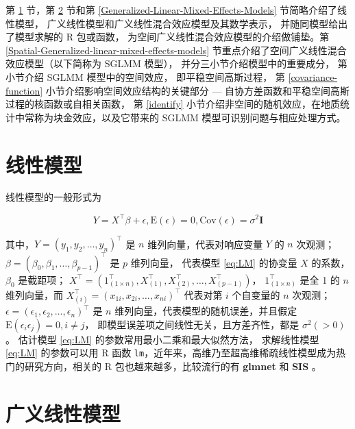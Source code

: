 \documentclass[12pt,a4paper,UTF8,twoside]{book}
\theoremstyle{definition}
\theoremstyle{definition}
\theoremstyle{definition}
\theoremstyle{remark}
\begin{document}
第 \ref{Linear-Models} 节，第 \ref{Generalized-Linear-Models} 节和第
\ref{Generalized-Linear-Mixed-Effects-Models} 节简略介绍了线性模型，
广义线性模型和广义线性混合效应模型及其数学表示，
并随同模型给出了模型求解的 R 包或函数，
为空间广义线性混合效应模型的介绍做铺垫。第
\ref{Spatial-Generalized-linear-mixed-effects-models}
节重点介绍了空间广义线性混合效应模型（以下简称为 SGLMM 模型），
并分三小节介绍模型中的重要成分， 第 小节介绍 SGLMM 模型中的空间效应，
即平稳空间高斯过程， 第 \ref{covariance-function}
小节介绍影响空间效应结构的关键部分 ---
自协方差函数和平稳空间高斯过程的核函数或自相关函数， 第 \ref{identify}
小节介绍非空间的随机效应，在地质统计中常称为块金效应，以及它带来的 SGLMM
模型可识别问题与相应处理方式。

\hypertarget{Linear-Models}{%
\section{线性模型}\label{Linear-Models}}

线性模型的一般形式为

\begin{equation}
Y = X^{\top}\beta + \epsilon, \mathrm{E}(\epsilon) = 0, \mathrm{Cov}(\epsilon) = \sigma^2\mathbf{I}  \label{eq:LM}
\end{equation}

\noindent 其中，\(Y = (y_1,y_2,\ldots,y_n)^{\top}\) 是 \(n\)
维列向量，代表对响应变量 \(Y\) 的 \(n\) 次观测；
\(\beta = (\beta_0,\beta_1,\ldots,\beta_{p-1})^{\top}\) 是 \(p\)
维列向量， 代表模型 \eqref{eq:LM} 的协变量 \(X\) 的系数，\(\beta_0\)
是截距项；
\(X^{\top} = (1_{(1\times n)}^{\top},X_{(1)}^{\top},X_{(2)}^{\top},\ldots,X_{(p-1)}^{\top})\)，
\(1_{(1\times n)}^{\top}\) 是全 1 的 \(n\) 维列向量，而
\(X_{(i)}^{\top} = (x_{1i},x_{2i},\ldots,x_{ni})^{\top}\) 代表对第 \(i\)
个自变量的 \(n\) 次观测；
\(\epsilon = (\epsilon_1,\epsilon_2,\ldots,\epsilon_n)^{\top}\) 是 \(n\)
维列向量，代表模型的随机误差，并且假定
\(\mathrm{E}(\epsilon_i \epsilon_j) = 0, i \ne j\)，
即模型误差项之间线性无关，且方差齐性，都是 \(\sigma^2(>0)\)。 估计模型
\eqref{eq:LM} 的参数常用最小二乘和最大似然方法， 求解线性模型 \eqref{eq:LM}
的参数可以用 R 函数
\texttt{lm}，近年来，高维乃至超高维稀疏线性模型成为热门的研究方向，相关的
R 包也越来越多，比较流行的有 \textbf{glmnet} \citep{glmnet2011JSS} 和
\textbf{SIS} \citep{SIS2016JSS}。

\hypertarget{Generalized-Linear-Models}{%
\section{广义线性模型}\label{Generalized-Linear-Models}}
\end{document}
